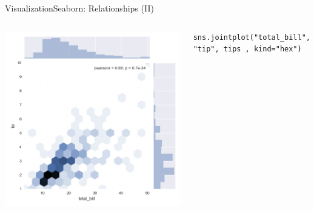 \documentclass[10pt,compress]{beamer} %
\begin{document}
\begin{frame}[fragile]{Visualization}{Seaborn: Relationships (II)}
\begin{columns}[t]
	\includegraphics[width=\textwidth]{figs/sns-jointplothex.png}\\
	\begin{exampleblock}{}
	\vspace{-0.2cm} 
	\begin{lstlisting}[basicstyle=\tiny]
	sns.jointplot("total_bill", "tip", tips , kind="hex")
	\end{lstlisting}
	\vspace{-0.2cm} 
	\end{exampleblock}

	\end{columns}
\end{frame}
\end{document}
